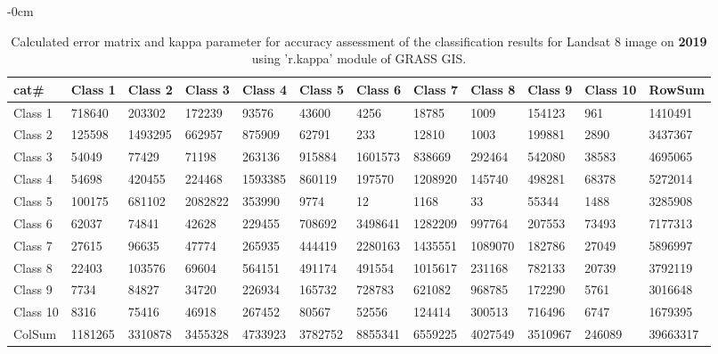 \documentclass[sustainability,article,submit,pdftex,moreauthors]{Definitions/mdpi}
\begin{document}
\begin{table}[H] 
\footnotesize
    \centering
    \begin{adjustwidth}{-\extralength}{0cm}
    \caption{Calculated error matrix and kappa parameter for accuracy assessment of the classification results for Landsat 8 image on \textbf{2019} using 'r.kappa' module of GRASS GIS.\label{tab03}}
 	\begin{tabularx}{\fulllength}{|l|l|l|l|l|l|l|l|l|l|l|l|}
    \toprule
        cat\# & \textbf{Class 1} & \textbf{Class 2} & \textbf{Class 3} & \textbf{Class 4} & \textbf{Class 5} & \textbf{Class 6} & \textbf{Class 7} & \textbf{Class 8} & \textbf{Class 9} & \textbf{Class 10} & \textbf{RowSum} \\ \hline
        Class 1 & \cellcolor{green!20}718640 & 203302 & 172239 & 93576 & 43600 & 4256 & 18785 & 1009 & 154123 & 961 & 1410491 \\ \hline
        Class 2 & 125598 & \cellcolor{green!20}1493295 & 662957 & 875909 & 62791 & 233 & 12810 & 1003 & 199881 & 2890 & 3437367 \\ \hline
        Class 3 & 54049 & 77429 & \cellcolor{green!20}71198 & 263136 & 915884 & 1601573 & 838669 & 292464 & 542080 & 38583 & 4695065 \\ \hline
        Class 4 & 54698 & 420455 & 224468 & \cellcolor{green!20}1593385 & 860119 & 197570 & 1208920 & 145740 & 498281 & 68378 & 5272014 \\ \hline
        Class 5 & 100175 & 681102 & 2082822 & 353990 & \cellcolor{green!20}9774 & 12 & 1168 & 33 & 55344 & 1488 & 3285908 \\ \hline
        Class 6 & 62037 & 74841 & 42628 & 229455 & 708692 & \cellcolor{green!20}3498641 & 1282209 & 997764 & 207553 & 73493 & 7177313 \\ \hline
        Class 7 & 27615 & 96635 & 47774 & 265935 & 444419 & 2280163 & \cellcolor{green!20}1435551 & 1089070 & 182786 & 27049 & 5896997 \\ \hline
        Class 8 & 22403 & 103576 & 69604 & 564151 & 491174 & 491554 & 1015617 & \cellcolor{green!20}231168 & 782133 & 20739 & 3792119 \\ \hline
        Class 9 & 7734 & 84827 & 34720 & 226934 & 165732 & 728783 & 621082 & 968785 & \cellcolor{green!20}172290 & 5761 & 3016648 \\ \hline
        Class 10 & 8316 & 75416 & 46918 & 267452 & 80567 & 52556 & 124414 & 300513 & 716496 & \cellcolor{green!20}6747 & 1679395 \\ \hline
        ColSum & 1181265 & 3310878 & 3455328 & 4733923 & 3782752 & 8855341 & 6559225 & 4027549 & 3510967 & 246089 & \cellcolor{green!20}39663317 \\ \hline
        \bottomrule
    \end{tabularx}
    \end{adjustwidth}
\end{table}
\end{document}
